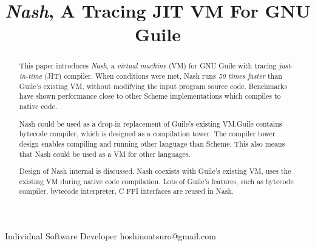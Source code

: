 \documentclass[preprint, numbers]{sigplanconf}
\begin{document}
\setlength{\pdfpageheight}{\paperheight}
\setlength{\pdfpagewidth}{\paperwidth}




\title{\textit{Nash}, A Tracing JIT VM For GNU Guile}

           {Individual Software Developer}
           {hoshinoatsuro@gmail.com}

\maketitle

\begin{abstract}

This paper introduces \textit{Nash}, a \textit{virtual machine} (VM) for GNU
Guile with tracing \textit{just-in-time} (JIT) compiler. When conditions were
met, Nash runs \textit{50 times faster} than Guile's existing VM, without
modifying the input program source code. Benchmarks have shown performance
close to other Scheme implementations which compiles to native code.

Nash could be used as a drop-in replacement of Guile's existing VM.\@ Guile
contains bytecode compiler, which is designed as a compilation tower. The
compiler tower design enables compiling and running other language than
Scheme. This also means that Nash could be used as a VM for other languages.

Design of Nash internal is discussed. Nash coexists with Guile's existing VM,
uses the existing VM during native code compilation. Lots of Guile's features,
such as bytecode compiler, bytecode interpreter, C FFI interfaces are reused
in Nash.

\end{abstract}
\end{document}
